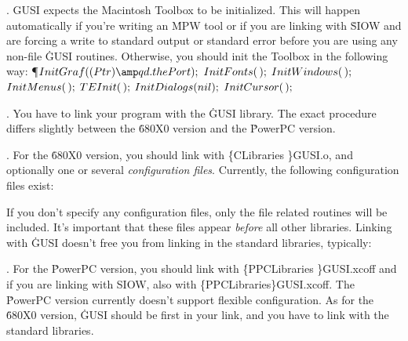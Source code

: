 \fi

. GUSI expects the Macintosh Toolbox to be initialized. This will happen
automatically
if you're writing an \.{MPW} tool or if you are linking with \.{SIOW} and are
forcing
a write to standard output or standard error before you are using any non-file %
\.{GUSI}
routines. Otherwise, you should init the Toolbox in the following way:
\Y\P $\\{InitGraf}((\\{Ptr})\amp\\{qd}.\\{thePort});$\6
$\\{InitFonts}(\,);$\6
$\\{InitWindows}(\,);$\6
$\\{InitMenus}(\,);$\6
$\\{TEInit}(\,);$\6
$\\{InitDialogs}(\\{nil});$\6
$\\{InitCursor}(\,);$\par
\fi

. You have to link your program with the \.{GUSI} library. The exact
procedure differs
slightly between the \.{680X0} version and the \.{PowerPC} version.

\fi

. For the  \.{680X0} version, you should link with \.{\{CLibraries%
\}GUSI.o},
and optionally one or several {\it configuration files}. Currently, the
following
configuration files exist:
\medskip{}

\medskip If you don't specify any configuration files, only the file related
routines will be
included. It's important that these files appear {\it before} all other
libraries.
Linking with \.{GUSI} doesn't free you from linking in the standard libraries,
typically:
\medskip{}

\fi

. For the \.{PowerPC} version, you should link with \.{\{PPCLibraries%
\}GUSI.xcoff} and
if you are linking with SIOW, also with \.{\{PPCLibraries\}GUSI.xcoff}. The %
\.{PowerPC}
version currently doesn't support flexible configuration. As for the \.{680X0}
version,
\.{GUSI} should be first in your link, and you have to link with the standard
libraries.


